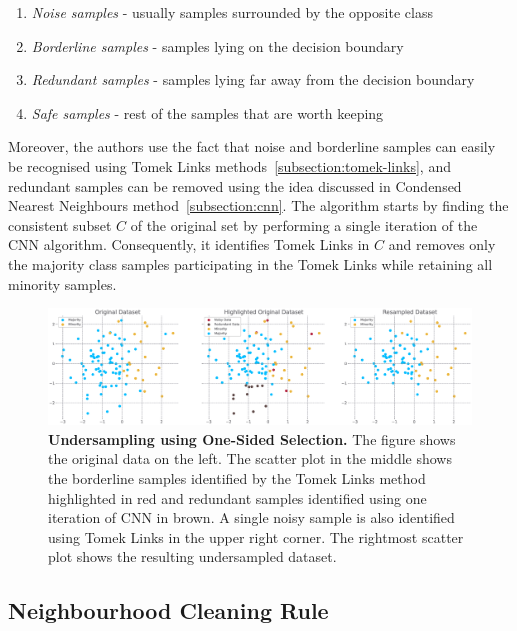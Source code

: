 \begin{enumerate}
    \item \emph{Noise samples} - usually samples surrounded by the opposite class
    \item \emph{Borderline samples} - samples lying on the decision boundary
    \item \emph{Redundant samples} - samples lying far away from the decision boundary
    \item \emph{Safe samples} - rest of the samples that are worth keeping
\end{enumerate}

Moreover, the authors use the fact that noise and borderline samples can easily be recognised using
Tomek Links methods~\ref{subsection:tomek-links}, and redundant samples can be removed using the
idea discussed in Condensed Nearest Neighbours method~\ref{subsection:cnn}. The algorithm starts by
finding the consistent subset $C$ of the original set by performing a single iteration of the CNN
algorithm. Consequently, it identifies Tomek Links in $C$ and removes only the majority class
samples participating in the Tomek Links while retaining all minority samples.

\begin{figure}
    \centering
    \includegraphics[width=\linewidth]{figures/oss.eps}
    \caption{
        \textbf{Undersampling using One-Sided Selection.} The figure shows the original data on the
        left. The scatter plot in the middle shows the borderline samples identified by the Tomek
        Links method highlighted in red and redundant samples identified using one iteration of CNN
        in brown. A single noisy sample is also identified using Tomek Links in the upper right
        corner. The rightmost scatter plot shows the resulting undersampled dataset.
    }
    \label{figure:oss}
\end{figure}


\subsection{Neighbourhood Cleaning Rule}
\label{subsection:neighbourhood-cleaning-rule}


